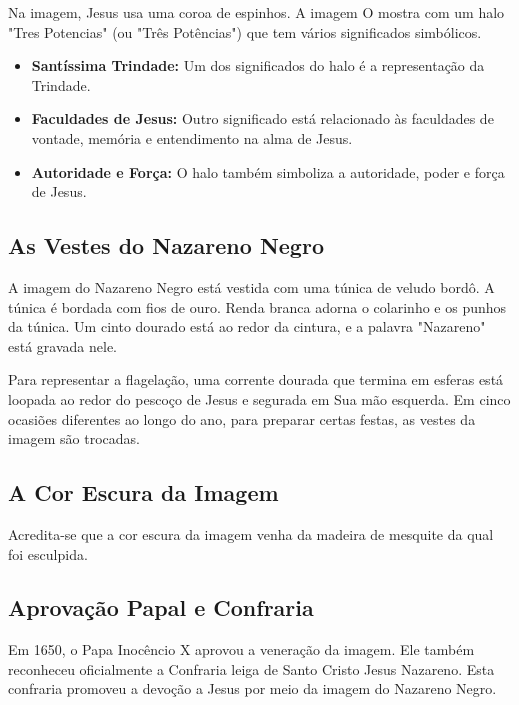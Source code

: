\documentclass[18pt]{article}
\begin{document}
\begin{justify}
\hspace{.45cm} Na imagem, Jesus usa uma coroa de espinhos. A imagem O mostra com um halo "Tres Potencias" (ou "Três Potências") que tem vários significados simbólicos. 

\begin{itemize}
 \item \textbf{Santíssima Trindade:} Um dos significados do halo é a representação da Trindade.
 \item \textbf{Faculdades de Jesus:} Outro significado está relacionado às faculdades de vontade, memória e entendimento na alma de Jesus.
 \item \textbf{Autoridade e Força:} O halo também simboliza a autoridade, poder e força de Jesus.
\end{itemize}


\subsection{As Vestes do Nazareno Negro}

\hspace{.45cm} A imagem do Nazareno Negro está vestida com uma túnica de veludo bordô. A túnica é bordada com fios de ouro. Renda branca adorna o colarinho e os punhos da túnica. Um cinto dourado está ao redor da cintura, e a palavra "Nazareno" está gravada nele.

Para representar a flagelação, uma corrente dourada que termina em esferas está loopada ao redor do pescoço de Jesus e segurada em Sua mão esquerda. Em cinco ocasiões diferentes ao longo do ano, para preparar certas festas, as vestes da imagem são trocadas.


\subsection{A Cor Escura da Imagem}

\hspace{.45cm} Acredita-se que a cor escura da imagem venha da madeira de mesquite da qual foi esculpida.


\subsection{Aprovação Papal e Confraria}

\hspace{.45cm} Em 1650, o Papa Inocêncio X aprovou a veneração da imagem. Ele também reconheceu oficialmente a Confraria leiga de Santo Cristo Jesus Nazareno. Esta confraria promoveu a devoção a Jesus por meio da imagem do Nazareno Negro.



\end{justify}
\end{document}

